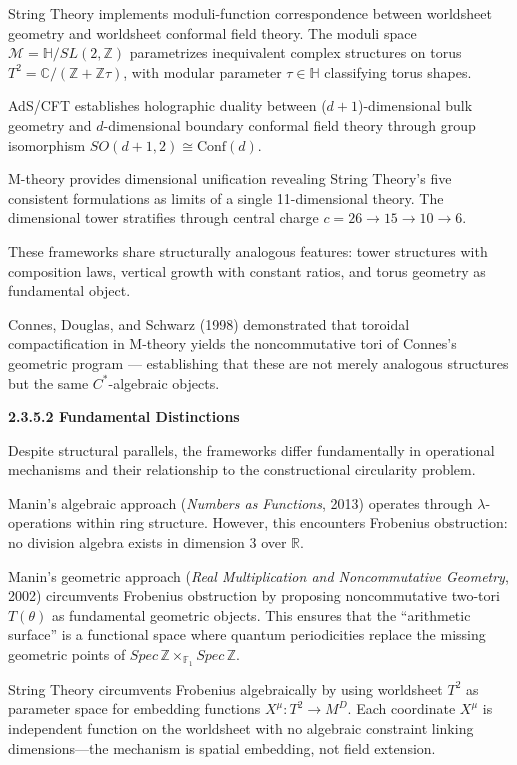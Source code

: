 String Theory implements moduli-function correspondence between worldsheet geometry and worldsheet conformal field theory. The moduli space $\mathcal{M} = \mathbb{H}/SL(2,\mathbb{Z})$ parametrizes inequivalent complex structures on torus $T^2 = \mathbb{C}/(\mathbb{Z} + \mathbb{Z}\tau)$, with modular parameter $\tau \in \mathbb{H}$ classifying torus shapes.

AdS/CFT establishes holographic duality between ($d+1$)-dimensional bulk geometry and $d$-dimensional boundary conformal field theory through group isomorphism $SO(d+1,2) \cong \text{Conf}(d)$.

M-theory provides dimensional unification revealing String Theory's five consistent formulations as limits of a single 11-dimensional theory. The dimensional tower stratifies through central charge $c = 26 \to 15 \to 10 \to 6$.

These frameworks share structurally analogous features: tower structures with composition laws, vertical growth with constant ratios, and torus geometry as fundamental object.

Connes, Douglas, and Schwarz (1998) demonstrated that toroidal compactification in M-theory yields the noncommutative tori of Connes's geometric program — establishing that these are not merely analogous structures but the same $C^*$-algebraic objects.

\textbf{2.3.5.2 Fundamental Distinctions}

Despite structural parallels, the frameworks differ fundamentally in operational mechanisms and their relationship to the constructional circularity problem.

Manin's algebraic approach (\textit{Numbers as Functions}, 2013) operates through $\lambda$-operations within ring structure. However, this encounters Frobenius obstruction: no division algebra exists in dimension 3 over $\mathbb{R}$.

Manin's geometric approach (\textit{Real Multiplication and Noncommutative Geometry}, 2002) circumvents Frobenius obstruction by proposing noncommutative two-tori $T(\theta)$ as fundamental geometric objects. This ensures that the ``arithmetic surface'' is a functional space where quantum periodicities replace the missing geometric points of $Spec\,\mathbb{Z} \times_{\mathbb{F}_1} Spec\,\mathbb{Z}$.

String Theory circumvents Frobenius algebraically by using worldsheet $T^2$ as parameter space for embedding functions $X^\mu: T^2 \to M^D$. Each coordinate $X^\mu$ is independent function on the worldsheet with no algebraic constraint linking dimensions—the mechanism is spatial embedding, not field extension.

